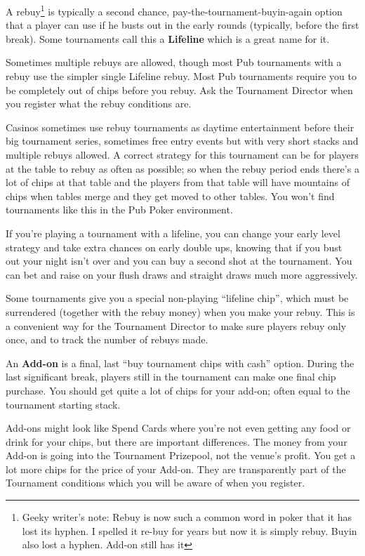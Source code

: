 A rebuy\footnote{Geeky writer's note: Rebuy is now such a common word in
poker that it has lost its hyphen. I spelled it re-buy for years but
now it is simply rebuy. Buyin also lost a hyphen.  Add-on still has it}
is typically a second chance, pay-the-tournament-buyin-again
option that a player can use if he busts out in the early rounds
(typically, before the first break). Some tournaments call this a
\textbf{Lifeline} which is a great name for it.

Sometimes multiple rebuys are allowed, though most Pub tournaments
with a rebuy use the simpler single Lifeline rebuy. Most Pub
tournaments require you to be completely out of chips before you
rebuy. Ask the Tournament Director when you register what
the rebuy conditions are.

Casinos sometimes use rebuy tournaments as daytime entertainment
before their big tournament series, sometimes free entry events
but with very short stacks and multiple rebuys allowed. A correct
strategy for this tournament can be for players at the table
to rebuy as often as possible; so when the rebuy period ends there's
a lot of chips at that table and the players from that table will
have mountains of chips when tables merge and they get moved to
other tables. You won't find tournaments like this in the Pub Poker
environment.

If you're playing a tournament with a lifeline, you can change
your early level strategy and take extra chances on early
double ups, knowing that if you bust out your night isn't over and
you can buy a second shot at the tournament. You can bet and raise
on your flush draws and straight draws much more aggressively.

Some tournaments give you a special non-playing ``lifeline chip'',
which must be surrendered (together with the rebuy money) when you
make your rebuy. This is a convenient way for the Tournament
Director to make sure players rebuy only once, and to track the number
of rebuys made.

An \textbf{Add-on} is a final, last ``buy tournament chips with cash''
option. During the last significant break, players still
in the tournament can make one final chip purchase. You should get
quite a lot of chips for your add-on; often equal to the tournament
starting stack.

Add-ons might look like Spend Cards where you're not even
getting any food or drink for your chips, but there are important
differences. The money from your Add-on is going into the Tournament
Prizepool, not the venue's profit. You get a lot more chips for
the price of your Add-on. They are transparently part of the
Tournament conditions which you will be aware of when you register.

